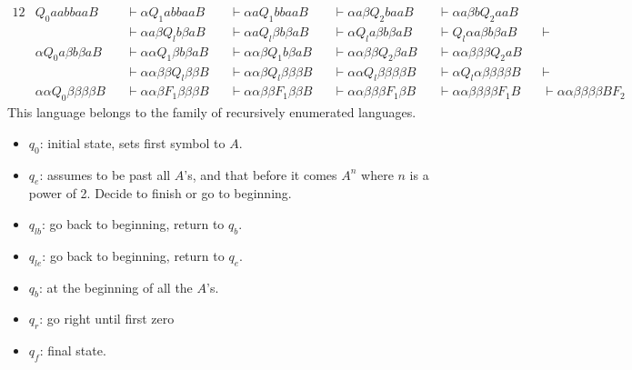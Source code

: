 \documentclass[docid=TP11]{tcom_TP}
\begin{document}
{\begin{center}
\end{center}
\begin{alignat*}{12}
	& Q_0 aabbaaB &&\vdash \alpha  Q_1 abbaa B &&\vdash \alpha a Q_1 bbaa B &&\vdash \alpha a\beta  Q_2 baaB &&\vdash \alpha a\beta b Q_2 aaB \\
	&             &&\vdash \alpha a\beta  Q_l b\beta aB &&\vdash \alpha a Q_l \beta b\beta aB &&\vdash \alpha Q_l a \beta b\beta a B &&\vdash Q_l \alpha a \beta b\beta aB &&\vdash \\
	& \alpha Q_0 a \beta b\beta aB &&\vdash \alpha \alpha Q_1 \beta b\beta aB &&\vdash \alpha \alpha \beta Q_1 b\beta aB &&\vdash \alpha \alpha \beta \beta Q_2 \beta aB &&\vdash \alpha \alpha \beta \beta \beta Q_2 aB \\
	&            &&\vdash \alpha \alpha \beta \beta Q_l \beta \beta B &&\vdash \alpha \alpha \beta Q_l \beta \beta \beta B &&\vdash \alpha \alpha Q_l \beta \beta \beta \beta B &&\vdash \alpha Q_l \alpha \beta \beta \beta \beta B && \vdash \\
	& \alpha \alpha Q_0 \beta \beta \beta \beta B &&\vdash \alpha \alpha \beta F_1 \beta \beta \beta B &&\vdash \alpha \alpha \beta \beta F_1 \beta \beta B &&\vdash \alpha \alpha \beta \beta \beta F_1 \beta B &&\vdash \alpha \alpha \beta \beta \beta \beta F_1 B &&\vdash \alpha \alpha \beta \beta \beta \beta B F_2
\end{alignat*}
This language belongs to the family of recursively enumerated languages.
\pagebreak
{}
\begin{itemize}
	\itemsep0em
	\item $q_0$: initial state, sets first symbol to $A$.
	\item $q_e$: assumes to be past all $A$'s, and that before it comes $A^n$ where $n$ is a power of 2. Decide to finish or go to beginning.
	\item $q_{lb}$: go back to beginning, return to $q_b$.
	\item $q_{le}$: go back to beginning, return to $q_e$.
	\item $q_b$: at the beginning of all the $A$'s.
	\item $q_r$: go right until first zero
	\item $q_f$: final state.
\end{itemize}
}
\end{document}
